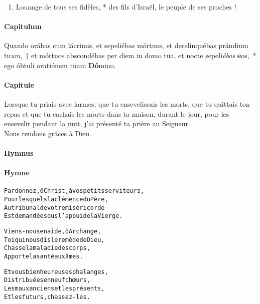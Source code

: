 \documentclass[twoside]{article}
\begin{document}
\begin{paracol}[1]{2}
\begin{enumerate}[wide, itemsep=0mm, labelwidth=!, labelindent=0pt, label=\color{gregoriocolor}\theenumi]
\item Louange de tous ses fidèles, *
des fils d’Israël, le peuple de ses proches !

\end{enumerate}
\switchcolumn*

\paragraph{Capitulum}
Quando orábas cum lácrimis, et sepeliébas mórtuos, et derelinquébas prándium tu\textit{um},~† et mórtuos abscondébas per diem in domo tua, et nocte sepeli\textit{ébas} \textbf{e}os,~* ego óbtuli oratiónem tuam \textbf{Dó}mino.


\switchcolumn

\paragraph{Capitule}
 \capsaut Lorsque tu priais avec larmes, que tu ensevelissais les morts, que tu quittais ton repas et que tu cachais les morts dans ta maison, durant le jour, pour les ensevelir pendant la nuit, j’ai présenté ta prière au Seigneur.\\
\rr Nous rendons grâces à Dieu.

\switchcolumn*

\paragraph{Hymnus}


\switchcolumn

\paragraph{Hymne}
\begin{alltt}\normalfont



Pardonnez, ô Christ, à vos petits serviteurs,
Pour lesquels la clémence du Père,
Au tribunal de votre miséricorde
Est demandée sous l’appui de la Vierge.

Viens-nous en aide, ô Archange,
Toi qui nous dis le remède de Dieu,
Chasse la maladie des corps,
Apporte la santé aux âmes.

Et vous bienheureuses phalanges,
Distribuées en neuf chœurs,
Les maux anciens et les présents,
Et les futurs, chassez-les.


\end{alltt}
\end{paracol}
\end{document}
